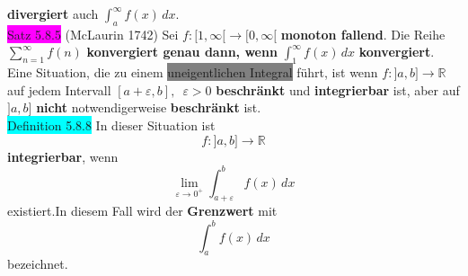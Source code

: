 \documentclass[landscape, 10pt]{article}
\newcommand{\R}{\mathbb{R}}
\begin{document}
\begin{multicols}{3}
                            \textbf{divergiert} auch 
                            \textcolor{NavyBlue}{
                            $\int_a^\infty f(x)\,dx$}.\\
              \colorbox{magenta}{Satz 5.8.5} 
              (McLaurin 1742) 
                     Sei \textcolor{NavyBlue}{
                     $f:[1,\infty[\longrightarrow[0,\infty[$} 
                     \textbf{monoton fallend}. Die Reihe 
                     \textcolor{NavyBlue}{
                     $\sum_{n=1}^\infty f(n)$} 
                     \textbf{konvergiert genau dann, wenn} 
                     \textcolor{NavyBlue}{
                     $\int_1^\infty f(x)\,dx$} 
                     \textbf{konvergiert}. \\
              Eine Situation, die zu einem 
                     \colorbox{gray}{uneigentlichen Integral} 
                     führt, ist wenn \textcolor{NavyBlue}{
                     $f:]a,b]\longrightarrow\R$} 
                     auf jedem Intervall 
                     \textcolor{NavyBlue}{
                     $[a+\varepsilon,b],\enspace\varepsilon>0$} 
                     \textbf{beschränkt} und 
                     \textbf{integrierbar} ist, aber auf 
                     \textcolor{NavyBlue}{$]a,b]$} 
                     \textbf{nicht} notwendigerweise 
                     \textbf{beschränkt} ist. \\
              \colorbox{cyan}{Definition 5.8.8} 
                     In dieser Situation ist
                     \begin{equation*}
                            f:]a,b]\longrightarrow\R
                     \end{equation*}
                     \textbf{integrierbar}, wenn
                     \begin{equation*}
                            \lim\limits_{\varepsilon\to0^+}
                            \int_{a+\varepsilon}^bf(x)\,dx  
                     \end{equation*}
                     existiert.In diesem Fall wird der 
                     \textbf{Grenzwert} mit
                     \begin{equation*}
                            \int_a^bf(x)\,dx
                     \end{equation*}
                     bezeichnet. \\


\end{multicols}
\end{document}
